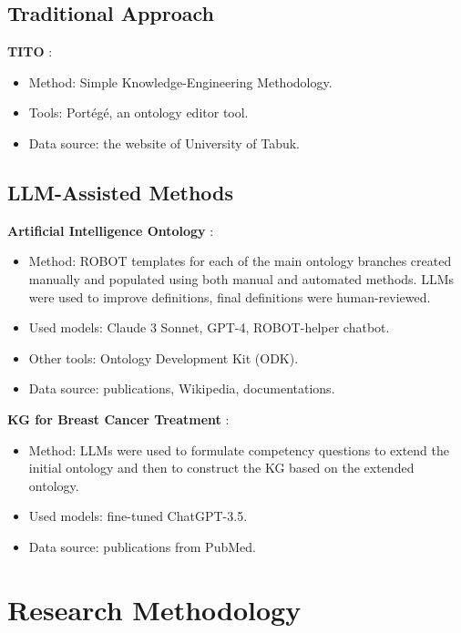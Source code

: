 \documentclass{article}
\begin{document}

\subsection{Traditional Approach}

\textbf{TITO} \cite{Alfaifi2022}:
\begin{itemize}
    \item Method: Simple Knowledge-Engineering Methodology.
    \item Tools: Portégé, an ontology editor tool.
    \item Data source: the website of University of Tabuk.
\end{itemize}

\subsection{LLM-Assisted Methods}

\textbf{Artificial Intelligence Ontology} \cite{Joachimiak2024}:
\begin{itemize}
    \item Method: ROBOT templates for each of the main ontology branches created manually and populated using both manual and automated methods. LLMs were used to improve definitions, final definitions were human-reviewed.
    \item Used models: Claude 3 Sonnet, GPT-4, ROBOT-helper chatbot.
    \item Other tools: Ontology Development Kit (ODK).
    \item Data source: publications, Wikipedia, documentations.
\end{itemize}

\textbf{KG for Breast Cancer Treatment} \cite{Yang2024}:
\begin{itemize}
    \item Method: LLMs were used to formulate competency questions to extend the initial ontology and then to construct the KG based on the extended ontology.
    \item Used models: fine-tuned ChatGPT-3.5.
    \item Data source: publications from PubMed.
\end{itemize}

\section{Research Methodology}
\end{document}
